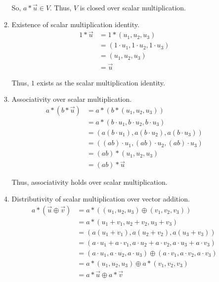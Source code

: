 \documentclass[12pt,letterpaper]{article}
\begin{document}
\begin{enumerate}
\begin{enumerate}
           So, $a * \vec{u} \in V$.
           Thus, $V$ is closed over scalar multiplication.
           
         \item Existence of scalar multiplication identity.  
           \begin{align*}
             1 * \vec{u} &= 1 * (u_1, u_2, u_3) \\
             &= (1 \cdot u_1, 1 \cdot u_2, 1 \cdot u_3) \\
             &= (u_1, u_2, u_3) \\
             &= \vec{u}
           \end{align*}
           
           Thus, $1$ exists as the scalar multiplication identity.
           
         \item Associativity over scalar multiplication.  
           \begin{align*}
             a * (b * \vec{u}) &= a * (b * (u_1, u_2, u_3)) \\
             &= a * (b \cdot u_1, b \cdot u_2, b \cdot u_3) \\
             &= (a (b \cdot u_1), a (b \cdot u_2), a (b \cdot u_3)) \\
             &= ((a b) \cdot u_1, (a b) \cdot u_2, (a b) \cdot u_3) \\
             &= (a b) * (u_1, u_2, u_3) \\
             &= (a b) * \vec{u}
           \end{align*}
           
           Thus, associativity holds over scalar multiplication.
           
         \item Distributivity of scalar multiplication over vector addition.
           \begin{align*}
             a * (\vec{u} \oplus \vec{v}) &= a * ((u_1, u_2, u_3) \oplus (v_1, v_2, v_3)) \\
             &= a * (u_1 + v_1, u_2 + v_2, u_3 + v_3) \\
             &= (a (u_1 + v_1), a (u_2 + v_2), a (u_3 + v_3)) \\
             &= (a \cdot u_1 + a \cdot v_1, a \cdot u_2 + a \cdot v_2, a \cdot u_3 + a \cdot v_3) \\
             &= (a \cdot u_1, a \cdot u_2, a \cdot u_3) \oplus (a \cdot v_1, a \cdot v_2, a \cdot v_3) \\
             &= a * (u_1, u_2, u_3) \oplus a * (v_1, v_2, v_3) \\
             &= a * \vec{u} \oplus a * \vec{v}
           \end{align*}  
           

\end{enumerate}
\end{enumerate}
\end{document}
